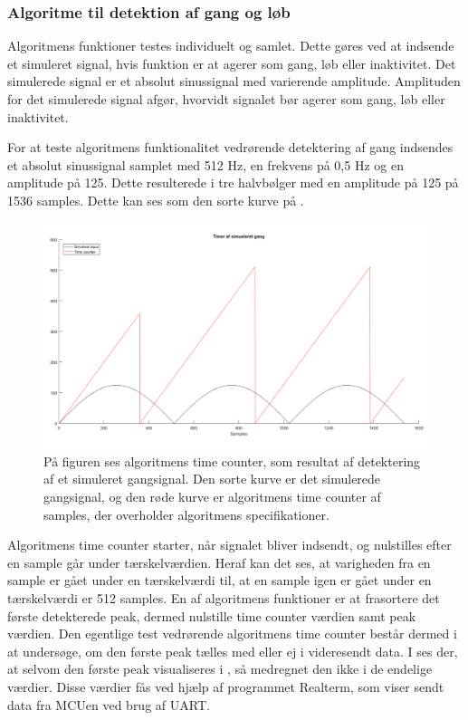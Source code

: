 \subsubsection{Algoritme til detektion af gang og løb}
Algoritmens funktioner testes individuelt og samlet. Dette gøres ved at indsende et simuleret signal, hvis funktion er at agerer som gang, løb eller inaktivitet. Det simulerede signal er et absolut sinussignal med varierende amplitude. Amplituden for det simulerede signal afgør, hvorvidt signalet bør agerer som gang, løb eller inaktivitet.  

For at teste algoritmens funktionalitet vedrørende detektering af gang indsendes et absolut sinussignal samplet med 512 Hz, en frekvens på 0,5 Hz og en amplitude på 125. Dette resulterede i tre halvbølger med en amplitude på 125 på 1536 samples. Dette kan ses som den sorte kurve på .
\begin{figure}[H]
	\centering
	\includegraphics[scale=0.35]{figures/cDesign/test_timecount_gang.png}
	\caption{På figuren ses algoritmens time counter, som resultat af detektering af et simuleret gangsignal. Den sorte kurve er det simulerede gangsignal, og den røde kurve er algoritmens time counter af samples, der overholder algoritmens specifikationer.}
	\label{fig:testgraf_timecounter}
\end{figure}
Algoritmens time counter starter, når signalet bliver indsendt, og nulstilles efter en sample går under tærskelværdien. Heraf kan det ses, at varigheden fra en sample er gået under en tærskelværdi til, at en sample igen er gået under en tærskelværdi er 512 samples. En af algoritmens funktioner er at frasortere det første detekterede peak, dermed nulstille time counter værdien samt peak værdien. Den egentlige test vedrørende algoritmens time counter består dermed i at undersøge, om den første peak tælles med eller ej i videresendt data. I  ses der, at selvom den første peak visualiseres i , så medregnet den ikke i de endelige værdier. Disse værdier fås ved hjælp af programmet Realterm, som viser sendt data fra MCUen ved brug af UART.
